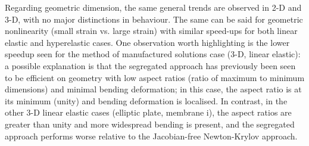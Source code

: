 \documentclass[sn-mathphys,Numbered]{sn-jnl}%
\begin{document}
Regarding geometric dimension, the same general trends are observed in 2-D and 3-D, with no major distinctions in behaviour.
The same can be said for geometric nonlinearity (small strain vs. large strain) with similar speed-ups for both linear elastic and hyperelastic cases.
One observation worth highlighting is the lower speedup seen for the method of manufactured solutions case (3-D, linear elastic): a possible explanation is that the segregated approach has previously been seen to be efficient on geometry with low aspect ratios (ratio of maximum to minimum dimensions) and minimal bending deformation;
in this case, the aspect ratio is at its minimum (unity) and bending deformation is localised.
In contrast, in the other 3-D linear elastic cases (elliptic plate, membrane i), the aspect ratios are greater than unity and more widespread bending is present, and the segregated approach performs worse relative to the Jacobian-free Newton-Krylov approach. 



\end{document}
